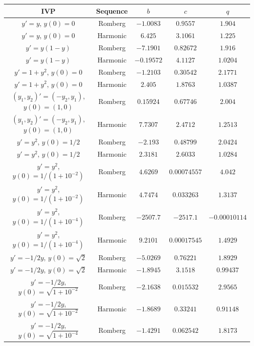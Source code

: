 \begin{table}[H]
    \centering
    \begin{tabular}{c|c||c|c|c}
           IVP & Sequence & \(b\) & \(c\) & \(q\) \\\hline\hline
$y'=y$, $y(0) = 0$ & Romberg & \(-1.0083\) & \(0.9557\) & \(1.904\) \\
$y'=y$, $y(0) = 0$ & Harmonic & \(6.425\) & \(3.1061\) & \(1.225\) \\
$y' = y(1-y)$ & Romberg & \(-7.1901\) & \(0.82672\) & \(1.916\) \\
$y' = y(1-y)$ & Harmonic & \(-0.19572\) & \(4.1127\) & \(1.0204\) \\
$y' = 1 + y^2$, $y(0) = 0$ & Romberg & \(-1.2103\) & \(0.30542\) & \(2.1771\) \\
$y' = 1 + y^2$, $y(0) = 0$ & Harmonic & \(2.405\) & \(1.8763\) & \(1.0387\) \\
$(y_1,y_2)' = (-y_2,y_1)$, $y(0) = (1,0)$ & Romberg & \(0.15924\) & \(0.67746\) & \(2.004\) \\
$(y_1,y_2)' = (-y_2,y_1)$, $y(0) = (1,0)$ & Harmonic & \(7.7307\) & \(2.4712\) & \(1.2513\) \\
$y' = y^2$, $y(0) = 1/2$ & Romberg & \(-2.193\) & \(0.48799\) & \(2.0424\) \\
$y' = y^2$, $y(0) = 1/2$ & Harmonic & \(2.3181\) & \(2.6033\) & \(1.0284\) \\
$y'=y^2$, $y(0) = 1/(1+10^{-2})$ & Romberg & \(4.6269\) & \(0.00074557\) & \(4.042\) \\
$y'=y^2$, $y(0) = 1/(1+10^{-2})$ & Harmonic & \(4.7474\) & \(0.033263\) & \(1.3137\) \\
$y'=y^2$, $y(0) = 1/(1+10^{-4})$ & Romberg & \(-2507.7\) & \(-2517.1\) & \(-0.00010114\) \\
$y'=y^2$, $y(0) = 1/(1+10^{-4})$ & Harmonic & \(9.2101\) & \(0.00017545\) & \(1.4929\) \\
$y' = -1/2y$, $y(0) = \sqrt{2}$ & Romberg & \(-5.0269\) & \(0.76221\) & \(1.8929\) \\
$y' = -1/2y$, $y(0) = \sqrt{2}$ & Harmonic & \(-1.8945\) & \(3.1518\) & \(0.99437\) \\
$y' = -1/2y$, $y(0) = \sqrt{1+10^{-2}}$ & Romberg & \(-2.1638\) & \(0.015532\) & \(2.9565\) \\
$y' = -1/2y$, $y(0) = \sqrt{1+10^{-2}}$ & Harmonic & \(-1.8689\) & \(0.33241\) & \(0.91148\) \\
$y' = -1/2y$, $y(0) = \sqrt{1+10^{-4}}$ & Romberg & \(-1.4291\) & \(0.062542\) & \(1.8173\) \\

\end{tabular}
\end{table}
